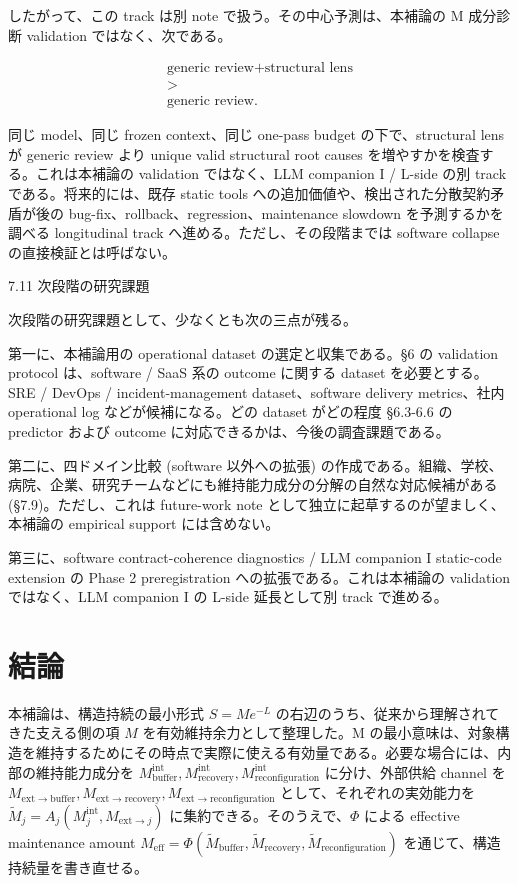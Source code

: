 \documentclass[12pt,a4paper]{article}
\begin{document}
したがって、この track は別 note で扱う。その中心予測は、本補論の M 成分診断 validation ではなく、次である。

\[
\begin{aligned}
\text{generic review} + \text{structural lens} \\
> \\
\text{generic review}.
\end{aligned}
\]

同じ model、同じ frozen context、同じ one-pass budget の下で、structural lens が generic review より unique valid structural root causes を増やすかを検査する。これは本補論の validation ではなく、LLM companion I / L-side の別 track である。将来的には、既存 static tools への追加価値や、検出された分散契約矛盾が後の bug-fix、rollback、regression、maintenance slowdown を予測するかを調べる longitudinal track へ進める。ただし、その段階までは software collapse の直接検証とは呼ばない。

7.11 次段階の研究課題

次段階の研究課題として、少なくとも次の三点が残る。

第一に、本補論用の operational dataset の選定と収集である。§6 の validation protocol は、software / SaaS 系の outcome に関する dataset を必要とする。SRE / DevOps / incident-management dataset、software delivery metrics、社内 operational log などが候補になる。どの dataset がどの程度 §6.3-6.6 の predictor および outcome に対応できるかは、今後の調査課題である。

第二に、四ドメイン比較 (software 以外への拡張) の作成である。組織、学校、病院、企業、研究チームなどにも維持能力成分の分解の自然な対応候補がある (§7.9)。ただし、これは future-work note として独立に起草するのが望ましく、本補論の empirical support には含めない。

第三に、software contract-coherence diagnostics / LLM companion I static-code extension の Phase 2 preregistration への拡張である。これは本補論の validation ではなく、LLM companion I の L-side 延長として別 track で進める。

\section{結論}\label{ux7d50ux8ad6}

本補論は、構造持続の最小形式 \(S = M e^{-L}\) の右辺のうち、従来から理解されてきた支える側の項 \(M\) を有効維持余力として整理した。M の最小意味は、対象構造を維持するためにその時点で実際に使える有効量である。必要な場合には、内部の維持能力成分を \(M_{\mathrm{buffer}}^{\mathrm{int}}, M_{\mathrm{recovery}}^{\mathrm{int}}, M_{\mathrm{reconfiguration}}^{\mathrm{int}}\) に分け、外部供給 channel を \(M_{\mathrm{ext}\to\mathrm{buffer}}, M_{\mathrm{ext}\to\mathrm{recovery}}, M_{\mathrm{ext}\to\mathrm{reconfiguration}}\) として、それぞれの実効能力を \(\widetilde M_j = A_j(M_j^{\mathrm{int}}, M_{\mathrm{ext}\to j})\) に集約できる。そのうえで、\(\Phi\) による effective maintenance amount \(M_{\mathrm{eff}} = \Phi(\widetilde M_{\mathrm{buffer}}, \widetilde M_{\mathrm{recovery}}, \widetilde M_{\mathrm{reconfiguration}})\) を通じて、構造持続量を書き直せる。
\end{document}
